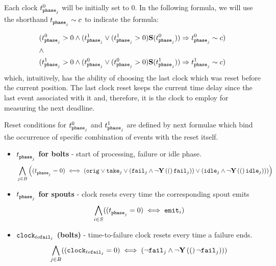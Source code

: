 Each clock $ t_{\mathtt{phase}_{j}}^{0} $ will be initially set to 0. 
In the following formula, we will use the shorthand $ t_{\mathtt{phase}_{j}}^{} \sim c$ to indicate the formula:


\begin{align*}
%
&  (\tph{j}{0} >  0 \land  (\tph{j}{1} \lor (\tph{j}{1} > 0) \Snc (\tph{j}{0})) \Rightarrow \tph{j}{0} \sim c )\\
%
& \land \\
%
& (\tph{j}{1} >  0 \land  (\tph{j}{0} \lor (\tph{j}{0} > 0) \Snc (\tph{j}{1})) \Rightarrow \tph{j}{1} \sim c )\\
%
\end{align*} 
%
which, intuitively, has the ability of choosing the last clock which was reset before the current position. 
The last clock reset keeps the current time delay since the last event associated with it and, therefore, it is the clock to employ for measuring the next deadline.

Reset conditions for $t_{\mathtt{phase}_{j}}^{0}$ and $t_{\mathtt{phase}_{j}}^{1}$ are defined by next formulae which bind the occurrence of specific combination of events with the reset itself.

\begin{itemize}
 \item \textbf{ $ t_{\mathtt{phase}_{j}}^{} $ for bolts} - start of processing, failure or idle phase.
\begin{align*}
%
& \bigwedge_{
	\begin{subarray}{c}
	j \in B\\
	\end{subarray}
}
\left(
(\tph{j}{} =  0) \iff %
\left(\ori \lor \ta{j} \lor %
(\f{j} \land \lnot \Y (\f{j}) )  \lor %
(\id{j} \land \lnot \Y (\id{j}) ) \right) 
\right)\\ 
%
\end{align*} 
 \item \textbf{$ t_{\mathtt{phase}_{j}}^{} $ for spouts } - clock resets every time the corresponding spout emits
\begin{align*}
%
& \bigwedge_{
	\begin{subarray}{c}
	i \in S\\
	\end{subarray}
}
((\tph{j}{} =  0) \iff 
\e{i})\\ 
%
\end{align*} 
 \item \textbf{$ \mathtt{clock}_{to\mathtt{fail}_{j}} $ (bolts)} - time-to-failure clock resets every time a failure ends.
\begin{align*}
%
& \bigwedge_{
	\begin{subarray}{c}
	j \in B\\
	\end{subarray}
}
((\cltf{j} =  0) \iff 
 (\lnot \f{j} \land \lnot \Y (\lnot \f{j})))\\ 
%
\end{align*} 
\end{itemize}

